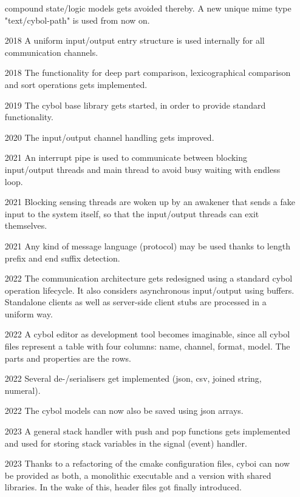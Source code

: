 \begin{itemize}
        compound state/logic models gets avoided thereby.
        A new unique mime type "text/cybol-path" is used from now on.
    \item[2018] A uniform input/output entry structure is used internally
        for all communication channels.
    \item[2018] The functionality for deep part comparison, lexicographical
        comparison and sort operations gets implemented.
    \item[2019] The cybol base library gets started, in order to provide
        standard functionality.
    \item[2020] The input/output channel handling gets improved.
    \item[2021] An interrupt pipe is used to communicate between blocking
        input/output threads and main thread to avoid busy waiting with endless loop.
    \item[2021] Blocking sensing threads are woken up by an awakener that sends
        a fake input to the system itself, so that the input/output threads
        can exit themselves.
    \item[2021] Any kind of message language (protocol) may be used
        thanks to length prefix and end suffix detection.
    \item[2022] The communication architecture gets redesigned using
        a standard cybol operation lifecycle. It also considers asynchronous
        input/output using buffers. Standalone clients as well as server-side
        client stubs are processed in a uniform way.
    \item[2022] A cybol editor as development tool becomes imaginable,
        since all cybol files represent a table with four columns:
        name, channel, format, model. The parts and properties are the rows.
    \item[2022] Several de-/serialisers get implemented (json, csv, joined string, numeral).
    \item[2022] The cybol models can now also be saved using json arrays.
    \item[2023] A general stack handler with push and pop functions gets implemented
        and used for storing stack variables in the signal (event) handler.
    \item[2023] Thanks to a refactoring of the cmake configuration files, cyboi can now
        be provided as both, a monolithic executable and a version with shared libraries.
        In the wake of this, header files got finally introduced.
\end{itemize}
